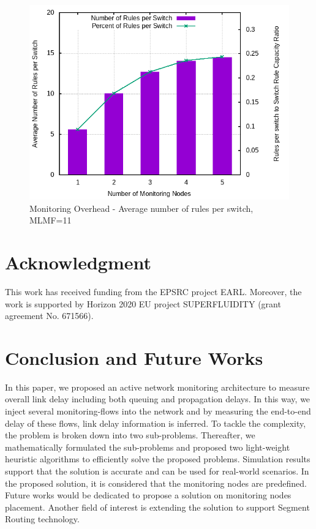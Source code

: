 \documentclass[10pt, journal, letterpaper]{IEEEtran}
\begin{document}
\begin{figure}
    \centering
    \includegraphics[width=\columnwidth]{img/eval_barchart_Average_Percent_of_Rules_to_Switch_Rule_Capacity_Ratio_max_len_of_route_11.png}
    \caption{Monitoring Overhead - Average number of rules per switch, MLMF=11}
    \label{fig:eval_barchart_Average_Percent_of_Rules_to_Switch_Rule_Capacity_Ratio_max_len_of_route_11}
\end{figure}

\section*{Acknowledgment}
This work has received funding from the EPSRC project EARL. Moreover, the work is supported by Horizon 2020 EU project SUPERFLUIDITY (grant agreement No. 671566).

\section{Conclusion and Future Works}
In this paper, we proposed an active network monitoring architecture to measure overall link delay including both queuing and propagation delays. In this way, we inject several monitoring-flows into the network and by measuring the end-to-end delay of these flows, link delay information is inferred. To tackle the complexity, the problem is broken down into two sub-problems. Thereafter, we mathematically formulated the sub-problems and proposed two light-weight heuristic algorithms to efficiently solve the proposed problems. Simulation results support that the solution is accurate and can be used for real-world scenarios. In the proposed solution, it is considered that the monitoring nodes are predefined. Future works would be dedicated to propose a solution on monitoring nodes placement. Another field of interest is extending the solution to support Segment Routing technology. 





\end{document}
